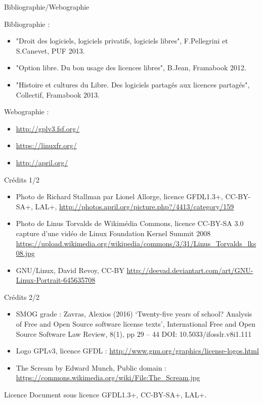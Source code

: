 \documentclass{beamer}
\begin{document}
\begin{frame}{Bibliographie/Webographie}

Bibliographie :

  \begin{itemize}
  \item "Droit des logiciels, logiciels privatifs, logiciels libres", F.Pellegrini et S.Canevet, PUF 2013.
  \item "Option libre. Du bon usage des licences libres", B.Jean, Framabook 2012.
  \item "Histoire et cultures du Libre. Des logiciels partagés aux licences partagés", Collectif, Framabook 2013.
  \end{itemize}

Webographie :

\begin{itemize}
\item \url{http://gplv3.fsf.org/}
\item \url{https://linuxfr.org/}
\item \url{http://april.org/}
\end{itemize}
  
\end{frame}

\begin{frame}{Crédits 1/2}
  \begin{itemize}
  \item Photo de Richard Stallman par Lionel Allorge, licence GFDL1.3+, CC-BY-SA+, LAL+,  \url{http://photos.april.org/picture.php?/4413/category/159}
  \item Photo de Linus Torvalds de Wikimédia Commons, licence CC-BY-SA 3.0 capture d'une vidéo de Linux Foundation Kernel Summit 2008 \url{https://upload.wikimedia.org/wikipedia/commons/3/31/Linus_Torvalds_lks08.jpg}
  \item GNU/Linux, David Revoy, CC-BY \url{http://deevad.deviantart.com/art/GNU-Linux-Portrait-645635708}
   \end{itemize}
\end{frame}


\begin{frame}{Crédits 2/2}
  \begin{itemize}
\item SMOG grade : Zavras, Alexios (2016) ‘Twenty-five years of school? Analysis of Free and Open Source software license texts’, International Free and Open Source Software Law Review, 8(1),
pp 29 – 44 DOI: 10.5033/ifosslr.v8i1.111  
\item Logo GPLv3, licence GFDL : \url{http://www.gnu.org/graphics/license-logos.html}
\item The Scream by Edward Munch, Public domain : \url{https://commons.wikimedia.org/wiki/File:The_Scream.jpg}

  \end{itemize}
\end{frame}



\begin{frame}{Licence}
  Document sous licence GFDL1.3+, CC-BY-SA+, LAL+.
\end{frame}
\end{document}
